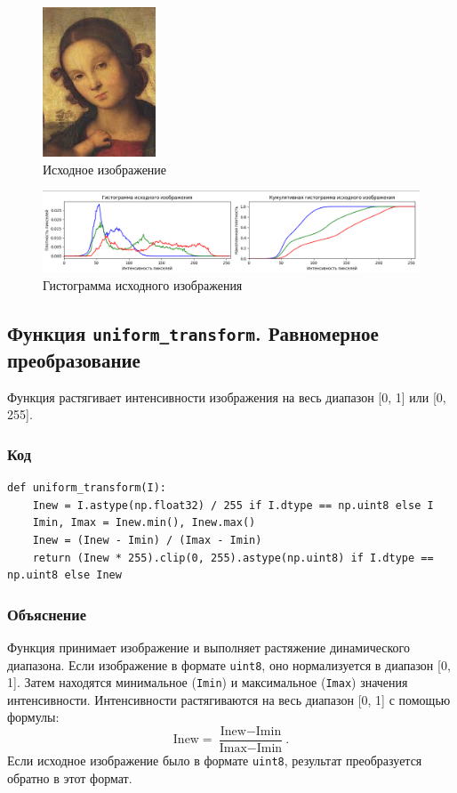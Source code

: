 \documentclass[a4paper,12pt]{article}
\begin{document}
\begin{figure}[H]
    \centering
    \includegraphics[width=0.3\textwidth]{im/im.jpg}
    \caption{Исходное изображение}
    \label{fig:example_image}
\end{figure}
\begin{figure}[H]
    \centering
    \includegraphics[width=1.0\textwidth]{im/1.png}
    \caption{Гистограмма исходного изображения}
    \label{fig:example_image}
\end{figure}



\subsection{Функция \texttt{uniform\_transform}. Равномерное преобразование}

Функция растягивает интенсивности изображения на весь диапазон [0, 1] или [0, 255].

\subsubsection{Код}
\begin{verbatim}
def uniform_transform(I):
    Inew = I.astype(np.float32) / 255 if I.dtype == np.uint8 else I
    Imin, Imax = Inew.min(), Inew.max()
    Inew = (Inew - Imin) / (Imax - Imin)
    return (Inew * 255).clip(0, 255).astype(np.uint8) if I.dtype == np.uint8 else Inew
\end{verbatim}

\subsubsection{Объяснение}
Функция принимает изображение и выполняет растяжение динамического диапазона. Если изображение в формате \texttt{uint8}, оно нормализуется в диапазон [0, 1]. Затем находятся минимальное (\texttt{Imin}) и максимальное (\texttt{Imax}) значения интенсивности. Интенсивности растягиваются на весь диапазон [0, 1] с помощью формулы:
\[
\text{Inew} = \frac{\text{Inew} - \text{Imin}}{\text{Imax} - \text{Imin}}.
\]
Если исходное изображение было в формате \texttt{uint8}, результат преобразуется обратно в этот формат.
\end{document}
